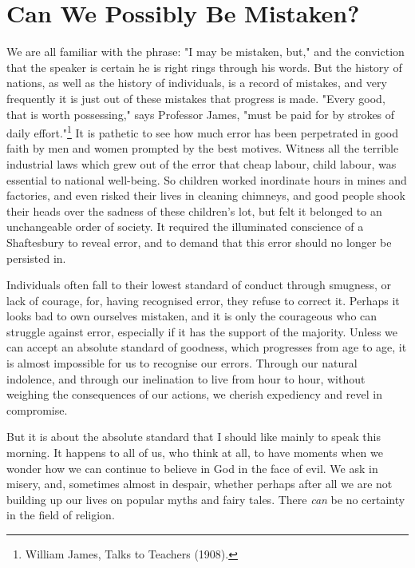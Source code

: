 \chapter{Can We Possibly Be Mistaken?}

We are all familiar with the phrase: "I may be
mistaken, but," and the conviction that the speaker is
certain he is right rings through his words. But the
history of nations, as well as the history of individuals,
is a record of mistakes, and very frequently it is just out
of these mistakes that progress is made. "Every good, that
is worth possessing," says Professor James, "must be paid
for by strokes of daily effort."\footnote{William James, Talks to Teachers (1908).}
It is pathetic to see
how much error has been perpetrated in good faith by men
and women prompted by the best motives. Witness all the
terrible industrial laws which grew out of the error that
cheap labour, child labour, was essential to national well-being.
So children worked inordinate hours in mines and
factories, and even risked their lives in cleaning
chimneys, and good people shook their heads over the
sadness of these children's lot, but felt it belonged to an
unchangeable order of society. It required the illuminated
conscience of a Shaftesbury to reveal error, and to demand
that this error should no longer be persisted in.

Individuals often fall to their lowest standard of
conduct through smugness, or lack of courage, for, having
recognised error, they refuse to correct it. Perhaps it
looks bad to own ourselves mistaken, and it is only the
courageous who can struggle against error, especially if it
has the support of the majority. Unless we can accept an
absolute standard of goodness, which progresses from age to
age, it is almost impossible for us to recognise our
errors. Through our natural indolence, and through our
inelination to live from hour to hour, without weighing the
consequences of our actions, we cherish expediency and
revel in compromise.

But it is about the absolute standard that I should
like mainly to speak this morning. It happens to all of
us, who think at all, to have moments when we wonder how we
can continue to believe in God in the face of evil. We ask
in misery, and, sometimes almost in despair, whether
perhaps after all we are not building up our lives on
popular myths and fairy tales. There \textsl{can} be no certainty
in the field of religion.


